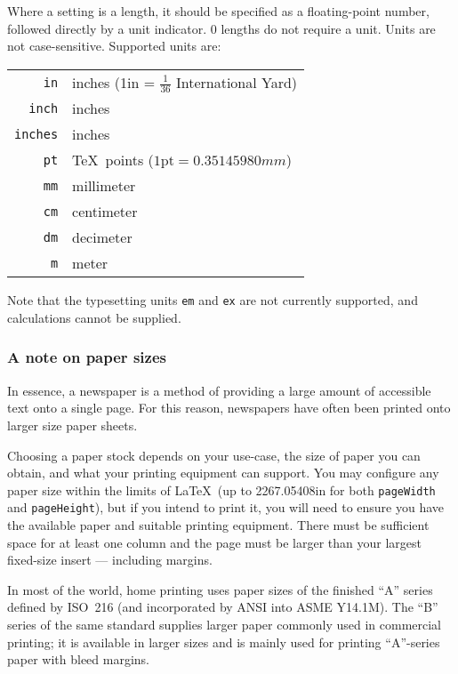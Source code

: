 \documentclass[a4paper,DIV=11]{scrartcl}
\begin{document}
Where a setting is a length, it should be specified as a
floating-point number, followed directly by a unit indicator. 0
lengths do not require a unit. Units are not case-sensitive.
Supported units are:
\begin{center}
  \begin{tabular}{r|l}
    \verb!in! & inches (1\textrm{in} = $\frac{1}{36}$ International Yard) \\
    \verb!inch! & inches \\
    \verb!inches! & inches \\
    \verb!pt! & \TeX\ points ($1\textrm{pt} = 0.35145980mm$) \\
    \verb!mm! & millimeter \\
    \verb!cm! & centimeter \\
    \verb!dm! & decimeter \\
    \verb!m! & meter
  \end{tabular}
\end{center}

Note that the typesetting units \verb!em! and \verb!ex! are not
currently supported, and calculations cannot be supplied.

\subsubsection*{A note on paper sizes}

In essence, a newspaper is a method of providing a large amount of
accessible text onto a single page. For this reason, newspapers have often
been printed onto larger size paper sheets.

Choosing a paper stock depends on your use-case, the size of paper you can
obtain, and what your printing equipment can support. You may
configure any paper size within the limits of \LaTeX\ (up to
2267.05408in for both \texttt{pageWidth} and \texttt{pageHeight}), but
if you intend to print it, you will need to ensure you have the
available paper and suitable printing equipment. There must be
sufficient space for at least one column and the page must be larger
than your largest fixed-size insert  --- including margins.

In most of the world, home printing uses paper sizes of the finished
``A'' series defined by ISO~216 (and incorporated by ANSI into ASME
Y14.1M). The ``B'' series of the same standard supplies larger paper
commonly used in commercial printing; it is available in larger sizes
and is mainly used for printing ``A''-series paper with bleed margins.
\end{document}
